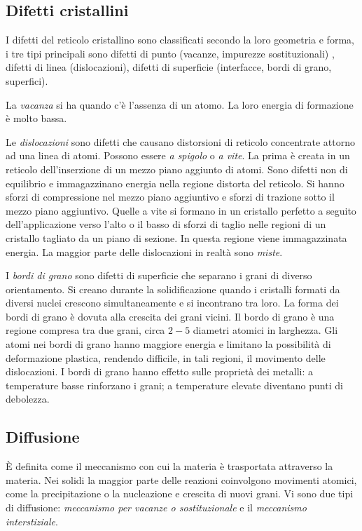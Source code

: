\documentclass[a5paper,12pt]{article}
\newcommand{\e}{\`E\xspace}  %
\begin{document}
\subsection{Difetti cristallini}
I difetti del reticolo cristallino sono classificati secondo la loro geometria e forma, i tre tipi principali sono difetti di punto (vacanze, impurezze sostituzionali) , difetti di linea (dislocazioni), difetti di superficie (interfacce, bordi di grano, superfici).

La \emph{vacanza} si ha quando c'è l'assenza di un atomo. La loro energia di formazione è molto bassa. 

Le \emph{dislocazioni} sono difetti che causano distorsioni di reticolo concentrate attorno ad una linea di atomi. Possono essere \emph{a spigolo} o \emph{a vite}. La prima è creata in un reticolo dell'inserzione di un mezzo piano aggiunto di atomi. Sono difetti non di equilibrio e immagazzinano energia nella regione distorta del reticolo. Si hanno sforzi di compressione nel mezzo piano aggiuntivo e sforzi di trazione sotto il mezzo piano aggiuntivo. Quelle a vite si formano in un cristallo perfetto a seguito dell'applicazione verso l'alto o il basso di sforzi di taglio nelle regioni di un cristallo tagliato da un piano di sezione. In questa regione viene immagazzinata energia. La maggior parte delle dislocazioni in realtà sono \emph{miste}.

I \emph{bordi di grano} sono difetti di superficie che separano i grani di diverso orientamento. Si creano durante la solidificazione quando i cristalli formati da diversi nuclei crescono simultaneamente e si incontrano tra loro. La forma dei bordi di grano è dovuta alla crescita dei grani vicini. Il bordo di grano è una regione compresa tra due grani, circa $2-5$ diametri atomici in larghezza. Gli atomi nei bordi di grano hanno maggiore energia e limitano la possibilità di deformazione plastica, rendendo difficile, in tali regioni, il movimento delle dislocazioni. I bordi di grano hanno effetto sulle proprietà dei metalli: a temperature basse rinforzano i grani; a temperature elevate diventano punti di debolezza. 
\subsection{Diffusione}
\e definita come il meccanismo con cui la materia è trasportata attraverso la materia. Nei solidi la maggior parte delle reazioni coinvolgono movimenti atomici, come la precipitazione o la nucleazione e crescita di nuovi grani. Vi sono due tipi di diffusione: \emph{meccanismo per vacanze o sostituzionale} e il \emph{meccanismo interstiziale}.
\end{document}
